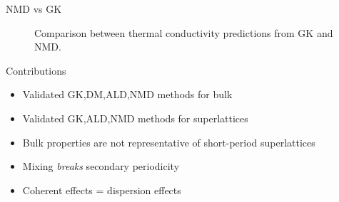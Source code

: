 \documentclass[xcolor=x11names,compress]{beamer}
\renewcommand{\(}{\begin{columns}}
\renewcommand{\)}{\end{columns}}
\newcommand{\<}[1]{\begin{column}{#1}}
\renewcommand{\>}{\end{column}}
\begin{document}
\begin{frame}{NMD vs GK}
\begin{figure}%
\begin{center}
\renewcommand{\figure}{Fig.}
\caption{Comparison between thermal conductivity predictions from GK and NMD.}
\label{FIG:NMD_v_GK}
\end{center}
\end{figure}
\end{frame}

\begin{frame}{Contributions}
\begin{itemize}
\item Validated GK,DM,ALD,NMD methods for bulk
\item Validated GK,ALD,NMD methods for superlattices
\item Bulk properties are not representative of short-period superlattices
\item Mixing \textit{breaks} secondary periodicity
\item Coherent effects = dispersion effects
\end{itemize}
\end{frame}

\end{document}
